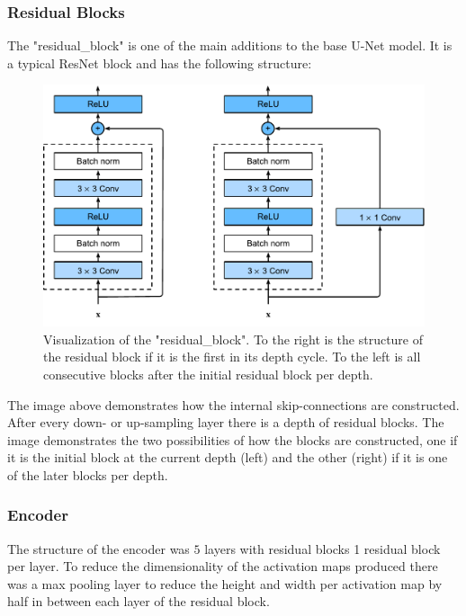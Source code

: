 \documentclass[fleqn,10pt]{SelfArx} %
\begin{document}
\subsubsection{Residual Blocks}
The "residual\_block" is one of the main additions to the base U-Net model. It is a typical ResNet block and has the following structure:
\begin{figure}[H]
    \centering
    \includegraphics[width=\linewidth]{report/Images/resnet-block.pdf}
    \caption{Visualization of the "residual\_block". To the right is the structure of the residual block if it is the first in its depth cycle. To the left is all consecutive blocks after the initial residual block per depth.}
    \label{fig:res_block}
\end{figure}
The image above demonstrates how the internal skip-connections are constructed. After every down- or up-sampling layer there is a depth of residual blocks. The image demonstrates the two possibilities of how the blocks are constructed, one if it is the initial block at the current depth (left) and the other (right) if it is one of the later blocks per depth.
\subsubsection{Encoder}
The structure of the encoder was $5$ layers with residual blocks 1 residual block per layer. To reduce the dimensionality of the activation maps produced there was a max pooling layer to reduce the height and width per activation map by half in between each layer of the residual block.
\end{document}
